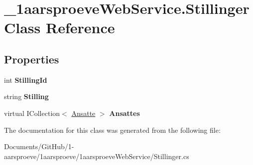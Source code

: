 \hypertarget{class__1aarsproeve_web_service_1_1_stillinger}{}\section{\+\_\+1aarsproeve\+Web\+Service.\+Stillinger Class Reference}
\label{class__1aarsproeve_web_service_1_1_stillinger}
\subsection*{Properties}
\begin{DoxyCompactItemize}
\item 
\hypertarget{class__1aarsproeve_web_service_1_1_stillinger_abc9c7259e2b525b5b59d71b1ab546459}{}int {\bfseries Stilling\+Id}\label{class__1aarsproeve_web_service_1_1_stillinger_abc9c7259e2b525b5b59d71b1ab546459}

\item 
\hypertarget{class__1aarsproeve_web_service_1_1_stillinger_a2fffdcd8c4a7552ba442d45a8ed23f0c}{}string {\bfseries Stilling}\label{class__1aarsproeve_web_service_1_1_stillinger_a2fffdcd8c4a7552ba442d45a8ed23f0c}

\item 
\hypertarget{class__1aarsproeve_web_service_1_1_stillinger_a23aaddc9e65bfc814502a809cc264793}{}virtual I\+Collection$<$ \hyperlink{class__1aarsproeve_web_service_1_1_ansatte}{Ansatte} $>$ {\bfseries Ansattes}\label{class__1aarsproeve_web_service_1_1_stillinger_a23aaddc9e65bfc814502a809cc264793}

\end{DoxyCompactItemize}


The documentation for this class was generated from the following file\+:\begin{DoxyCompactItemize}
\item 
Documents/\+Git\+Hub/1-\/aarsproeve/1aarsproeve/1aarsproeve\+Web\+Service/Stillinger.\+cs\end{DoxyCompactItemize}
